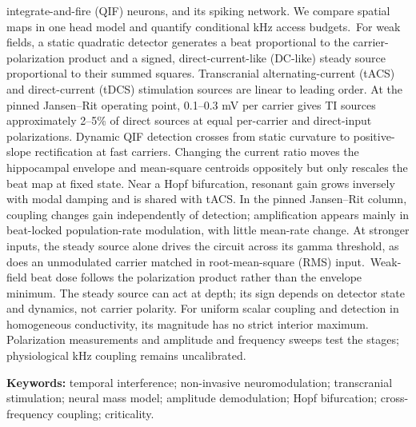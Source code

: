 \documentclass[11pt,a4paper]{article}
\begin{document}
integrate-and-fire (QIF) neurons, and its spiking network. We compare spatial maps in
one head model and quantify conditional kHz access budgets.\ For weak fields, a static quadratic detector generates a beat proportional to the
carrier-polarization product and a signed, direct-current-like (DC-like) steady source
proportional to their summed squares. Transcranial alternating-current (tACS) and direct-current (tDCS)
stimulation sources are linear to leading order. At the pinned
Jansen--Rit operating point, 0.1--0.3 mV per carrier gives TI sources approximately
2--5\% of direct sources at equal per-carrier and direct-input
polarizations. Dynamic QIF detection crosses from static curvature to positive-slope
rectification at fast carriers. Changing the current ratio moves the hippocampal
envelope and mean-square centroids oppositely but only rescales the beat map at
fixed state. Near a Hopf bifurcation, resonant gain grows inversely with modal damping
and is shared with tACS. In the pinned Jansen--Rit column, coupling changes gain
independently of detection; amplification appears mainly in beat-locked population-rate
modulation, with little mean-rate change. At stronger inputs, the steady source alone drives the circuit across its gamma
threshold, as does an unmodulated carrier matched in root-mean-square (RMS) input.\ Weak-field beat dose follows the polarization product rather than the envelope minimum.
The steady source can act at depth; its sign depends on detector state and dynamics,
not carrier polarity. For uniform scalar coupling and detection in homogeneous
conductivity, its magnitude has no strict interior maximum. Polarization measurements and amplitude and frequency sweeps test the
stages; physiological kHz coupling remains uncalibrated.
\fi

\smallskip
\noindent\textbf{Keywords:} temporal interference; non-invasive neuromodulation;
transcranial stimulation; neural mass model; amplitude demodulation; Hopf bifurcation;
cross-frequency coupling; criticality.

\clearpage
\tableofcontents
\clearpage
\end{document}
